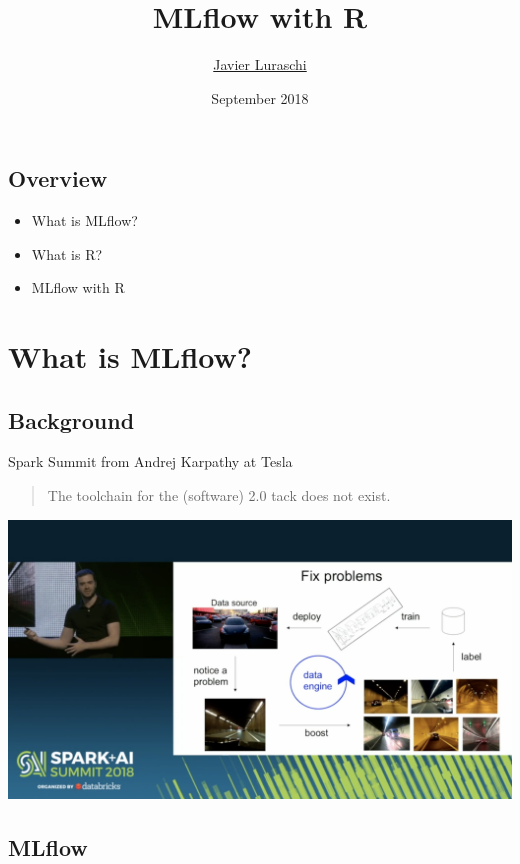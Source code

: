 \documentclass[]{article}
\title{MLflow with R}
\author{\href{https://github.com/javierluraschi}{Javier Luraschi}}
\date{September 2018}
\providecommand{\tightlist}{%
  \setlength{\itemsep}{0pt}\setlength{\parskip}{0pt}}
\begin{document}
\maketitle

\hypertarget{overview}{%
\subsection{Overview}\label{overview}}

\begin{itemize}
\tightlist
\item
  What is MLflow?
\item
  What is R?
\item
  MLflow with R
\end{itemize}

\hypertarget{what-is-mlflow}{%
\section{What is MLflow?}\label{what-is-mlflow}}

\hypertarget{background}{%
\subsection{Background}\label{background}}

Spark Summit from Andrej Karpathy at Tesla

\begin{quote}
The toolchain for the (software) 2.0 tack does not exist.
\end{quote}

\includegraphics{images/spark-summit-karpathy-model-lifecycle.png}

\hypertarget{mlflow}{%
\subsection{MLflow}\label{mlflow}}
\end{document}
